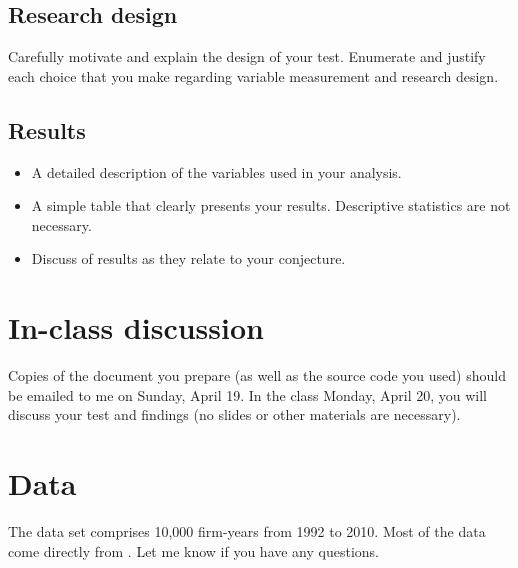 \documentclass[11pt]{amsart}
\theoremstyle{definition}
\theoremstyle{question}
\begin{document}
\subsection{Research design}
Carefully motivate and explain the design of your test. 
Enumerate and justify each choice that you make regarding  variable measurement and research design. 

\subsection{Results}
\begin{itemize}
    \item A detailed description of the variables used in your analysis. 
    \item A simple table that clearly presents your results. Descriptive statistics are not necessary.
    \item Discuss of results as they relate to your conjecture.
\end{itemize}

\section{In-class discussion}
Copies of the document you prepare (as well as the source code you used) should be emailed to me on Sunday, April 19.
In the class  Monday, April 20, you will discuss your test and findings (no slides or other materials are necessary).     

\section{Data}
The data set comprises 10,000 firm-years from 1992 to 2010. 
Most of the data come directly from \citet{Armstrong:2013hs}. 
Let me know if you have any questions.
\end{document}
